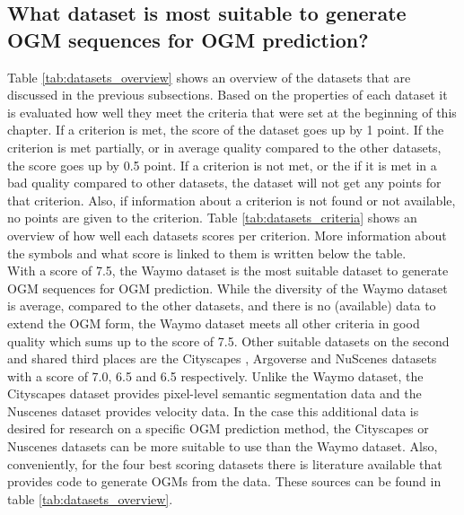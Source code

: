 \subsection{What dataset is most suitable to generate \gls{OGM} sequences for \gls{OGM} prediction?}

Table \ref{tab:datasets_overview} shows an overview of the datasets that are discussed in the previous subsections. Based on the properties of each dataset it is evaluated how well they meet the criteria that were set at the beginning of this chapter. If a criterion is met, the score of the dataset goes up by 1 point. If the criterion is met partially, or in average quality compared to the other datasets, the score goes up by 0.5 point. If a criterion is not met, or the if it is met in a bad quality compared to other datasets, the dataset will not get any points for that criterion. Also, if information about a criterion is not found or not available, no points are given to the criterion. Table \ref{tab:datasets_criteria} shows an overview of how well each datasets scores per criterion. More information about the symbols and what score is linked to them is written below the table. \\

With a score of 7.5, the Waymo \cite{sun2020scalability} dataset is the most suitable dataset to generate \gls{OGM} sequences for \gls{OGM} prediction. While the diversity of the Waymo dataset is average, compared to the other datasets, and there is no (available) data to extend the \gls{OGM} form, the Waymo dataset meets all other criteria in good quality which sums up to the score of 7.5. Other suitable datasets on the second and shared third places are the Cityscapes \cite{cordts2016cityscapes}, Argoverse \cite{chang2019argoverse} and NuScenes \cite{caesar2020nuscenes} datasets with a score of 7.0, 6.5 and 6.5 respectively. Unlike the Waymo dataset, the Cityscapes dataset provides pixel-level semantic segmentation data and the Nuscenes dataset provides velocity data. In the case this additional data is desired for research on a specific \gls{OGM} prediction method, the Cityscapes or Nuscenes datasets can be more suitable to use than the Waymo dataset. Also, conveniently, for the four best scoring datasets there is literature available that provides code to generate \glspl{OGM} from the data. These sources can be found in table \ref{tab:datasets_overview}.  

